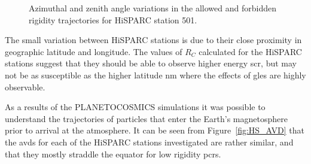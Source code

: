 \begin{figure}[h]
	\centering
	
	\caption{Azimuthal and zenith angle variations in the allowed and forbidden rigidity trajectories for HiSPARC station 501.}
	\label{fig:R_C2}
\end{figure}

The small variation between HiSPARC stations is due to their close proximity in geographic latitude and longitude. The values of $R_C$ calculated for the HiSPARC stations suggest that they should be able to observe higher energy \gls{scr}, but may not be as susceptible as the higher latitude \gls{nm} where the effects of \glspl{gle} are highly observable.

As a results of the PLANETOCOSMICS simulations it was possible to understand the trajectories of particles that enter the Earth's magnetosphere prior to arrival at the atmosphere. It can be seen from Figure~\ref{fig:HS_AVD} that the \glspl{avd} for each of the HiSPARC stations investigated are rather similar, and that they mostly straddle the equator for low rigidity \glspl{pcr}. 

